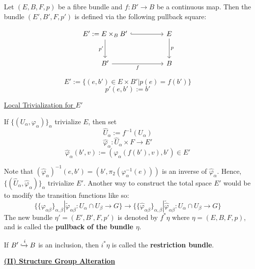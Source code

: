 \documentclass[11pt,a4paper]{article}
\begin{document}
Let $(E, B, F, p)$ be a fibre bundle and $f: B'\rightarrow B$ be a continuous map. Then the bundle $(E', B', F, p')$ is defined via the following pullback square:

$$\begin{tikzcd}[column sep=huge,row sep=large]
    E' := E\cross_B B' \arrow[hookrightarrow]{r} \arrow[d, "p'"'] &E \arrow[d, "p"]\\ B' \arrow[r, "f"'] & B
\end{tikzcd}$$


$$E' := \{(e, b')\in E\times B' |  p(e) = f(b')\}$$
$$p'(e, b'):= b'$$

\underline{Local Trivialization for $E'$}

If $\{(U_{\alpha}, \varphi_{\alpha})\}_{\alpha}$ trivialize $E$, then set
$$\widehat{U}_{\alpha}:= f^{-1}(U_{\alpha})$$
$$\widehat{\varphi}_{\alpha}: \widehat{U}_{\alpha}\times F \rightarrow E'$$
$$\widehat{\varphi}_{\alpha}(b', v):= (\varphi_{\alpha}(f(b'), v), b')\in E'$$


Note that $(\widehat{\varphi}_{\alpha})^{-1}(e, b') = (b', \pi_2(\varphi_{\alpha}^{-1}(e)))$ is an inverse of $\widehat{\varphi}_{\alpha}$. Hence, $\{(\widehat{U}_{\alpha}, \widehat{\varphi}_{\alpha})\}_{\alpha}$ trivialize $E'$. Another way to construct the total space $E'$ would be to modify the transition functions like so:
$$\big\{\{\varphi_{\alpha\beta}\}_{\alpha, \beta}  |   \widetilde{\varphi}_{\alpha\beta}:U_{\alpha}\cap U_{\beta} \rightarrow G\big\} \rightarrow \big\{\{\widehat{\varphi}_{\alpha\beta}\}_{\alpha, \beta}  |   \widetilde{\widehat{\varphi}}_{\alpha\beta}:U_{\alpha}\cap U_{\beta} \rightarrow G\big\}$$
The new bundle $\eta' = (E', B', F, p')$ is denoted by $f^*\eta$ where $\eta = (E, B, F, p)$, and is called the \textbf{pullback of the bundle $\eta$}.

If $B'\xhookrightarrow{i} B$ is an inclusion, then $i^*\eta$ is called the \textbf{restriction bundle}.

\underline{\textbf{(II) Structure Group Alteration}}
\end{document}
